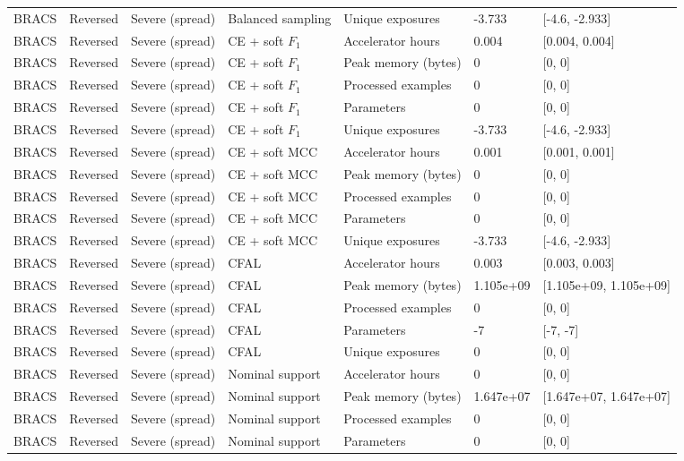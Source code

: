 \begin{longtable}{lllllll}
BRACS & Reversed & Severe (spread) & Balanced sampling & Unique exposures & -3.733 & [-4.6, -2.933] \\
BRACS & Reversed & Severe (spread) & CE + soft $F_1$ & Accelerator hours & 0.004 & [0.004, 0.004] \\
BRACS & Reversed & Severe (spread) & CE + soft $F_1$ & Peak memory (bytes) & 0 & [0, 0] \\
BRACS & Reversed & Severe (spread) & CE + soft $F_1$ & Processed examples & 0 & [0, 0] \\
BRACS & Reversed & Severe (spread) & CE + soft $F_1$ & Parameters & 0 & [0, 0] \\
BRACS & Reversed & Severe (spread) & CE + soft $F_1$ & Unique exposures & -3.733 & [-4.6, -2.933] \\
BRACS & Reversed & Severe (spread) & CE + soft MCC & Accelerator hours & 0.001 & [0.001, 0.001] \\
BRACS & Reversed & Severe (spread) & CE + soft MCC & Peak memory (bytes) & 0 & [0, 0] \\
BRACS & Reversed & Severe (spread) & CE + soft MCC & Processed examples & 0 & [0, 0] \\
BRACS & Reversed & Severe (spread) & CE + soft MCC & Parameters & 0 & [0, 0] \\
BRACS & Reversed & Severe (spread) & CE + soft MCC & Unique exposures & -3.733 & [-4.6, -2.933] \\
BRACS & Reversed & Severe (spread) & CFAL & Accelerator hours & 0.003 & [0.003, 0.003] \\
BRACS & Reversed & Severe (spread) & CFAL & Peak memory (bytes) & 1.105e+09 & [1.105e+09, 1.105e+09] \\
BRACS & Reversed & Severe (spread) & CFAL & Processed examples & 0 & [0, 0] \\
BRACS & Reversed & Severe (spread) & CFAL & Parameters & -7 & [-7, -7] \\
BRACS & Reversed & Severe (spread) & CFAL & Unique exposures & 0 & [0, 0] \\
BRACS & Reversed & Severe (spread) & Nominal support & Accelerator hours & 0 & [0, 0] \\
BRACS & Reversed & Severe (spread) & Nominal support & Peak memory (bytes) & 1.647e+07 & [1.647e+07, 1.647e+07] \\
BRACS & Reversed & Severe (spread) & Nominal support & Processed examples & 0 & [0, 0] \\
BRACS & Reversed & Severe (spread) & Nominal support & Parameters & 0 & [0, 0] \\

\end{longtable}
